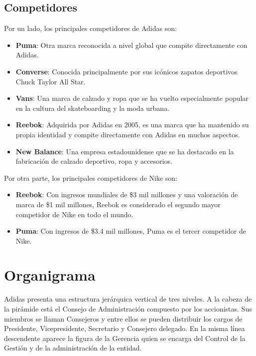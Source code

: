 \documentclass[a4paper,12pt]{article}
\begin{document}
\clearpage
\subsection{Competidores}

Por un lado, los principales competidores de Adidas son:
\begin{itemize}
\item \textbf{Puma}: Otra marca reconocida a nivel global que compite directamente con Adidas.
\item \textbf{Converse}: Conocida principalmente por sus icónicos zapatos deportivos Chuck Taylor All Star.
\item \textbf{Vans}: Una marca de calzado y ropa que se ha vuelto especialmente popular en la cultura del skateboarding y la moda urbana.
\item \textbf{Reebok}: Adquirida por Adidas en 2005, es una marca que ha mantenido su propia identidad y compite directamente con Adidas en muchos aspectos.
\item \textbf{New Balance}: Una empresa estadounidense que se ha destacado en la fabricación de calzado deportivo, ropa y accesorios.
\end{itemize}

Por otra parte, los principales competidores de Nike son:
\begin{itemize}
\item \textbf{Reebok}: Con ingresos mundiales de \$3 mil millones y una valoración de marca de \$1 mil millones, Reebok es considerado el segundo mayor competidor de Nike en todo el mundo.
\item \textbf{Puma}: Con ingresos de \$3.4 mil millones, Puma es el tercer competidor de Nike.
\end{itemize}

\clearpage

\section{Organigrama}

Adidas presenta una estructura jerárquica vertical de tres niveles. A la cabeza de la pirámide está el Consejo de Administración compuesto por los accionistas. Sus miembros se llaman Consejeros y entre ellos se pueden distribuir los cargos de Presidente, Vicepresidente, Secretario y Consejero delegado. En la misma línea descendente aparece la figura de la Gerencia quien se encarga del Control de la Gestión y de la administración de la entidad.
\end{document}
